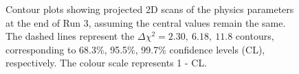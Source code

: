\begin{figure}[h]
\centering
{}
\caption{Contour plots showing projected 2D scans of the physics parameters at the end of Run 3, assuming the central values remain the same. The dashed lines represent the $\Delta \chi^2 = 2.30,\ 6.18,\ 11.8$ contours, corresponding to 68.3\%, 95.5\%, 99.7\% confidence levels (CL), respectively. The colour scale represents 1 - CL.}
\label{gammadiniplotsrun3}
\end{figure}


\clearpage
